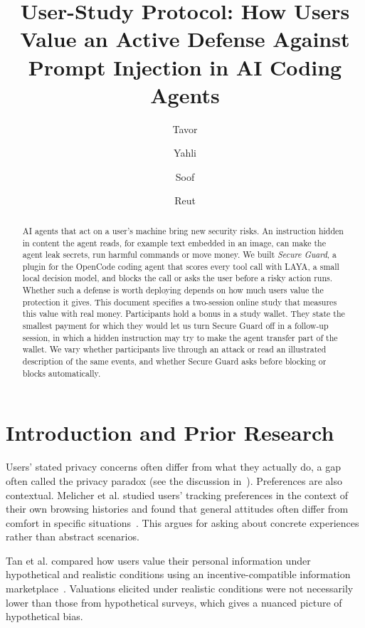 \documentclass[sigconf,nonacm]{acmart}
\begin{document}
\title{User-Study Protocol: How Users Value an Active Defense Against Prompt Injection in AI Coding Agents}

\author{Tavor}
\author{Yahli}
\author{Soof}
\author{Reut}

\begin{abstract}
AI agents that act on a user's machine bring new security risks. An instruction hidden in content the agent reads, for example text embedded in an image, can make the agent leak secrets, run harmful commands or move money. We built \emph{Secure Guard}, a plugin for the OpenCode coding agent that scores every tool call with LAYA, a small local decision model, and blocks the call or asks the user before a risky action runs. Whether such a defense is worth deploying depends on how much users value the protection it gives. This document specifies a two-session online study that measures this value with real money. Participants hold a bonus in a study wallet. They state the smallest payment for which they would let us turn Secure Guard off in a follow-up session, in which a hidden instruction may try to make the agent transfer part of the wallet. We vary whether participants live through an attack or read an illustrated description of the same events, and whether Secure Guard asks before blocking or blocks automatically.
\end{abstract}

\maketitle
\renewcommand{\shortauthors}{Tavor, Yahli, Soof and Reut}

\section{Introduction and Prior Research}
Users' stated privacy concerns often differ from what they actually do, a gap often called the privacy paradox (see the discussion in~\cite{tan2018}). Preferences are also contextual. Melicher et al. studied users' tracking preferences in the context of their own browsing histories and found that general attitudes often differ from comfort in specific situations~\cite{melicher2016}. This argues for asking about concrete experiences rather than abstract scenarios.

Tan et al. compared how users value their personal information under hypothetical and realistic conditions using an incentive-compatible information marketplace~\cite{tan2018}. Valuations elicited under realistic conditions were not necessarily lower than those from hypothetical surveys, which gives a nuanced picture of hypothetical bias.
\end{document}
